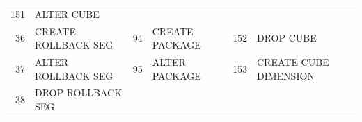 \begin{appendix}
\begin{longtable}[]{@{}rl|rl|rl@{}}
\begin{minipage}[t]{0.06\columnwidth}
151\strut
\end{minipage} & \begin{minipage}[t]{0.24\columnwidth}\raggedright\strut
ALTER CUBE\strut
\end{minipage}\tabularnewline
\begin{minipage}[t]{0.06\columnwidth}\raggedright\strut
36\strut
\end{minipage} & \begin{minipage}[t]{0.19\columnwidth}\raggedright\strut
CREATE ROLLBACK SEG\strut
\end{minipage} & \begin{minipage}[t]{0.06\columnwidth}\raggedright\strut
94\strut
\end{minipage} & \begin{minipage}[t]{0.24\columnwidth}\raggedright\strut
CREATE PACKAGE\strut
\end{minipage} & \begin{minipage}[t]{0.06\columnwidth}\raggedright\strut
152\strut
\end{minipage} & \begin{minipage}[t]{0.24\columnwidth}\raggedright\strut
DROP CUBE\strut
\end{minipage}\tabularnewline
\begin{minipage}[t]{0.06\columnwidth}\raggedright\strut
37\strut
\end{minipage} & \begin{minipage}[t]{0.19\columnwidth}\raggedright\strut
ALTER ROLLBACK SEG\strut
\end{minipage} & \begin{minipage}[t]{0.06\columnwidth}\raggedright\strut
95\strut
\end{minipage} & \begin{minipage}[t]{0.24\columnwidth}\raggedright\strut
ALTER PACKAGE\strut
\end{minipage} & \begin{minipage}[t]{0.06\columnwidth}\raggedright\strut
153\strut
\end{minipage} & \begin{minipage}[t]{0.24\columnwidth}\raggedright\strut
CREATE CUBE DIMENSION\strut
\end{minipage}\tabularnewline
\begin{minipage}[t]{0.06\columnwidth}\raggedright\strut
38\strut
\end{minipage} & \begin{minipage}[t]{0.19\columnwidth}\raggedright\strut
DROP ROLLBACK SEG\strut
\end{minipage} & \begin{minipage}[t]{0.06\columnwidth}\raggedright\strut

\end{minipage}
\end{longtable}
\end{appendix}
